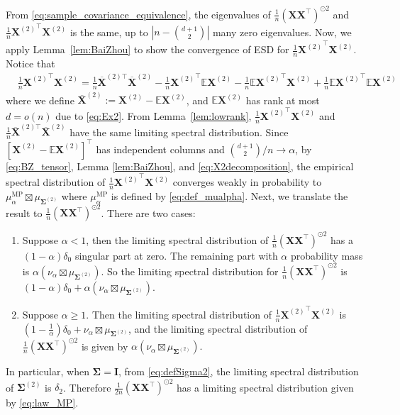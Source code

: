 \documentclass[twoside,11pt]{article}
\newcommand{\E}{\mathbb{E}}
\def\bI{{\mathbf I}}
\def\bX{{\boldsymbol X}}
\def\bSigma{{\boldsymbol \Sigma}}
\newcommand{\1}{\mathbf{1}}
\newenvironment{proofoflemma}[1]{\par\noindent{\bf Proof of Lemma #1\ }}{\hfill\BlackBox\\[2mm]}
\begin{document}
\begin{proofoflemma}{\ref{lem:MP_tensor}}
From \eqref{eq:sample_covariance_equivalence}, the eigenvalues of $\frac{1}{n}(\bX \bX^\top )^{\odot 2}$ and $\frac{1}{n} {\bX^{(2)}}^\top \bX^{(2)}$ is the same, up to $\left| n-\binom{d+1}{2}\right|$ many zero eigenvalues.
Now, we apply  Lemma~\ref{lem:BaiZhou} to show the convergence of ESD for $\frac{1}{n} {\bX^{(2)}}^\top \bX^{(2)}$. 
Notice that
\begin{align}
 &\frac{1}{n} {\bX^{(2)}}^\top \bX^{(2)} =\frac{1}{n}   \overline{\bX}^{(2)\top}\overline{\bX}^{(2)}-\frac{1}{n} {\bX^{(2)}}^\top\E\bX^{(2)}-\frac{1}{n} {\E\bX^{(2)}}^\top\bX^{(2)}+\frac{1}{n} {\E\bX^{(2)}}^\top\E\bX^{(2)} \label{eq:X2decomposition}
\end{align}
where we define
$
    \overline{\bX}^{(2)}:={\bX^{(2)}-\E\bX^{(2)}}$,
and $\E\bX^{(2)}$ has rank at most $d=o(n)$ due to \eqref{eq:Ex2}. From Lemma~\ref{lem:lowrank}, $\frac{1}{n} {\bX^{(2)}}^\top \bX^{(2)}$ and $\frac{1}{n}   \overline{\bX}^{(2)\top}\overline{\bX}^{(2)}$ have the same limiting spectral distribution.  Since $[{\bX^{(2)}-\E\bX^{(2)}}]^\top$ has independent columns and $\binom{d+1}{2}/n \to \alpha$, by \eqref{eq:BZ_tensor}, Lemma \ref{lem:BaiZhou}, and \eqref{eq:X2decomposition}, the empirical spectral distribution  of $\frac{1}{n} {\bX^{(2)}}^\top \bX^{(2)}$ converges weakly in probability to  $\mu_{\alpha}^{\mathrm{MP}}\boxtimes \mu_{\bSigma^{(2)}}$ where $\mu_{\alpha}^{\mathrm{MP}}$ is defined by \eqref{eq:def_mualpha}.  Next, we translate the result to $\frac{1}{n}(\bX \bX^\top )^{\odot 2}$. There are two cases:
\begin{enumerate}
    \item Suppose $\alpha< 1$, then the limiting spectral distribution of  $\frac{1}{n}(\bX \bX^\top )^{\odot 2}$ has a $(1-\alpha)\delta_{0}$ singular part at zero. The remaining part with $\alpha$ probability mass is  $\alpha \left(\nu_{\alpha}\boxtimes \mu_{\bSigma^{(2)}}\right)$. So the limiting spectral distribution for  $\frac{1}{n}(\bX \bX^\top )^{\odot 2}$  is 
    $(1-\alpha)\delta_0+\alpha \left(\nu_{\alpha}\boxtimes \mu_{\bSigma^{(2)}}\right)$.
    \item Suppose $\alpha\geq 1$. Then the limiting spectral distribution of $\frac{1}{n} {\bX^{(2)}}^\top \bX^{(2)}$ is $(1-\frac{1}{\alpha})\delta_{0}+\nu_{\alpha}\boxtimes \mu_{\bSigma^{(2)}}$, and the limiting spectral distribution of $\frac{1}{n}(\bX \bX^\top )^{\odot 2}$ is given by $\alpha\left(\nu_{\alpha}\boxtimes \mu_{\bSigma^{(2)}}\right).$
\end{enumerate}
In particular, when $\bSigma=\bI$, from \eqref{eq:defSigma2}, the limiting spectral distribution of $\bSigma^{(2)}$ is $\delta_{2}$. Therefore $\frac{1}{2n}(\bX \bX^\top )^{\odot 2}$ has a limiting spectral distribution given by \eqref{eq:law_MP}.
\end{proofoflemma}
\end{document}
